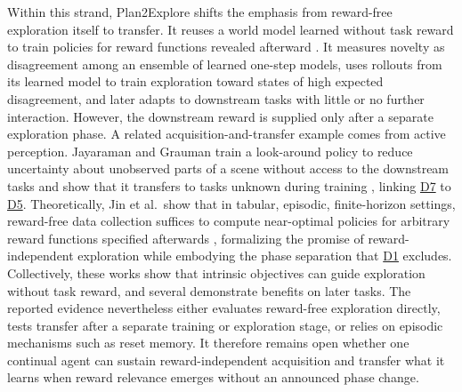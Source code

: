 \documentclass[10pt,journal,compsoc]{IEEEtran}
\DeclareRobustCommand{\Dref}[1]{\hyperref[sec:d#1]{D#1}}
\begin{document}
Within this strand, Plan2Explore shifts the emphasis from reward-free exploration itself to transfer.
It reuses a world model learned without task reward to train policies for reward functions revealed afterward \cite{sekar2020}.
It measures novelty as disagreement among an ensemble of learned one-step models, uses rollouts from its learned model to train exploration toward states of high expected disagreement, and later adapts to downstream tasks with little or no further interaction.
However, the downstream reward is supplied only after a separate exploration phase.
A related acquisition-and-transfer example comes from active perception.
Jayaraman and Grauman train a look-around policy to reduce uncertainty about unobserved parts of a scene without access to the downstream tasks and show that it transfers to tasks unknown during training \cite{jayaraman2018}, linking \Dref{7} to \Dref{5}.
Theoretically, Jin et al.\ show that in tabular, episodic, finite-horizon settings, reward-free data collection suffices to compute near-optimal policies for arbitrary reward functions specified afterwards \cite{jin2020}, formalizing the promise of reward-independent exploration while embodying the phase separation that \Dref{1} excludes.
Collectively, these works show that intrinsic objectives can guide exploration without task reward, and several demonstrate benefits on later tasks.
The reported evidence nevertheless either evaluates reward-free exploration directly, tests transfer after a separate training or exploration stage, or relies on episodic mechanisms such as reset memory.
It therefore remains open whether one continual agent can sustain reward-independent acquisition and transfer what it learns when reward relevance emerges without an announced phase change.
\end{document}
